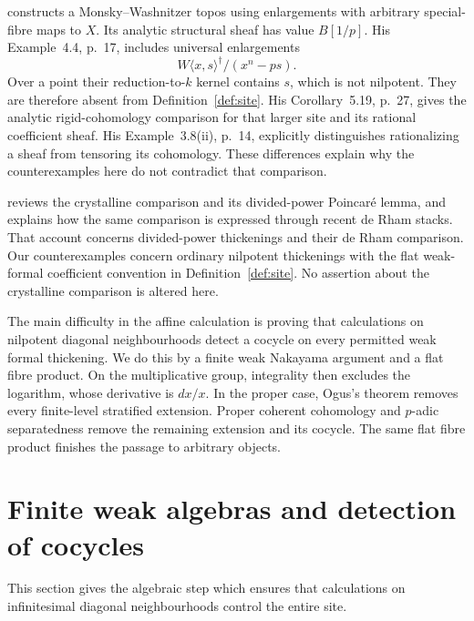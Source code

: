 \documentclass[11pt]{article}
\theoremstyle{definition}\newtheorem{definition}[theorem]{Definition}
\theoremstyle{remark}\newtheorem{remark}[theorem]{Remark}
\begin{document}
\citet[Definitions~3.1 and~3.7, Example~3.8(ii)]{Zhang} constructs a Monsky--Washnitzer topos using enlargements with arbitrary special-fibre maps to $X$. Its analytic structural sheaf has value $B[1/p]$. His Example~4.4, p.~17, includes universal enlargements
\[
 W\langle x,s\rangle^\dagger/(x^n-ps).
\]
Over a point their reduction-to-$k$ kernel contains $s$, which is not nilpotent. They are therefore absent from Definition~\ref{def:site}. His Corollary~5.19, p.~27, gives the analytic rigid-cohomology comparison for that larger site and its rational coefficient sheaf. His Example~3.8(ii), p.~14, explicitly distinguishes rationalizing a sheaf from tensoring its cohomology. These differences explain why the counterexamples here do not contradict that comparison.

\citet[\S3, pp.~834--835]{Illusie} reviews the crystalline comparison and its divided-power Poincar\'e lemma, and explains how the same comparison is expressed through recent de Rham stacks. That account concerns divided-power thickenings and their de Rham comparison. Our counterexamples concern ordinary nilpotent thickenings with the flat weak-formal coefficient convention in Definition~\ref{def:site}. No assertion about the crystalline comparison is altered here.

The main difficulty in the affine calculation is proving that calculations on nilpotent diagonal neighbourhoods detect a cocycle on every permitted weak formal thickening. We do this by a finite weak Nakayama argument and a flat fibre product. On the multiplicative group, integrality then excludes the logarithm, whose derivative is $dx/x$. In the proper case, Ogus's theorem removes every finite-level stratified extension. Proper coherent cohomology and $p$-adic separatedness remove the remaining extension and its cocycle. The same flat fibre product finishes the passage to arbitrary objects.

\section{Finite weak algebras and detection of cocycles}

This section gives the algebraic step which ensures that calculations on infinitesimal diagonal neighbourhoods control the entire site.
\end{document}
